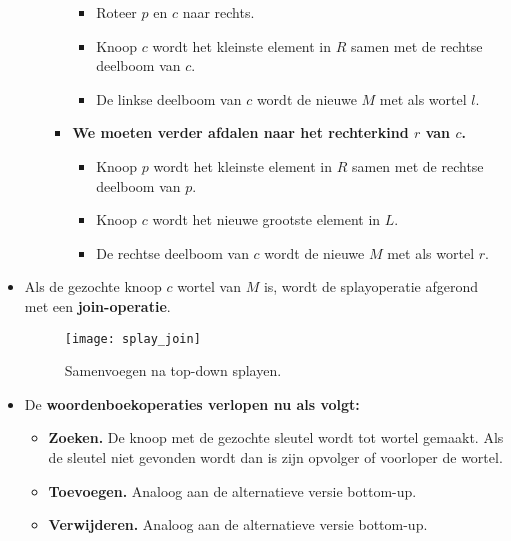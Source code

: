 \begin{itemize}
\begin{enumerate}
\begin{itemize}
\begin{itemize}
                \item Roteer $p$ en $c$ naar rechts.
                \item Knoop $c$ wordt het kleinste element in $R$ samen met de rechtse deelboom van $c$.
                \item De linkse deelboom van $c$ wordt de nieuwe $M$ met als wortel $l$.
            \end{itemize}
            \item \textbf{We moeten verder afdalen naar het rechterkind $r$ van $c$.}
            \begin{itemize}
                \item Knoop $p$ wordt het kleinste element in $R$ samen met de rechtse deelboom van $p$.
                \item Knoop $c$ wordt het nieuwe grootste element in $L$.
                \item De rechtse deelboom van $c$ wordt de nieuwe $M$ met als wortel $r$.
            \end{itemize}
        \end{itemize}
    \end{enumerate}
    \item Als de gezochte knoop $c$ wortel van $M$ is, wordt de splayoperatie afgerond met een \textbf{join-operatie}.
    \begin{figure}[ht]
        \centering
        \texttt{[image: splay\_join]}
        \caption{Samenvoegen na top-down splayen.}
        \label{fig:splay_join}
    \end{figure}
    \item De \textbf{woordenboekoperaties verlopen nu als volgt:}
    \begin{itemize}
        \item \textbf{Zoeken.} De knoop met de gezochte sleutel wordt tot wortel gemaakt. Als de sleutel niet gevonden wordt dan is zijn opvolger of voorloper de wortel.
        \item \textbf{Toevoegen.} Analoog aan de alternatieve versie bottom-up.
        \item \textbf{Verwijderen.} Analoog aan de alternatieve versie bottom-up.
    \end{itemize}
\end{itemize}

